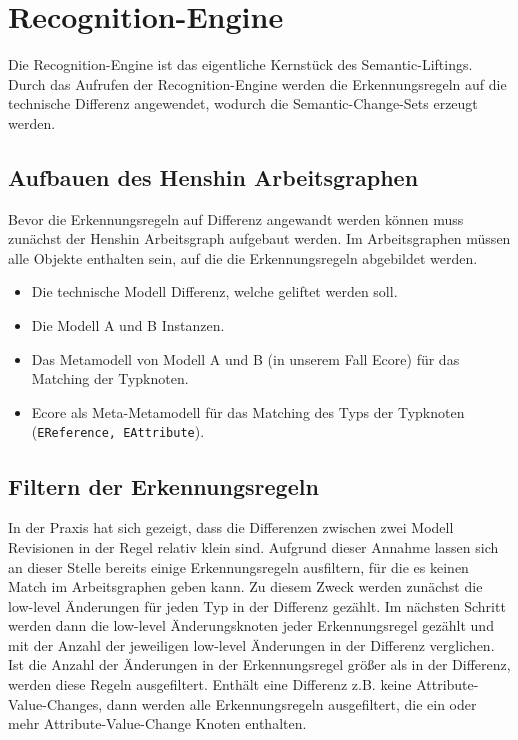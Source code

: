 \chapter{Recognition-Engine}
\label{recognition}

Die Recognition-Engine ist das eigentliche Kernstück des Semantic-Liftings. Durch das Aufrufen der
Recognition-Engine werden die Erkennungsregeln auf die technische Differenz angewendet, wodurch die
Semantic-Change-Sets erzeugt werden.

\section{Aufbauen des Henshin Arbeitsgraphen}

Bevor die Erkennungsregeln auf Differenz angewandt werden können muss zunächst der Henshin
Arbeitsgraph aufgebaut werden. Im Arbeitsgraphen müssen alle Objekte enthalten sein, auf die die
Erkennungsregeln abgebildet werden.

\begin{itemize}
  \item Die technische Modell Differenz, welche geliftet werden soll.
  \item Die Modell A und B Instanzen.
  \item Das Metamodell von Modell A und B (in unserem Fall Ecore) für das Matching der Typknoten.
  \item Ecore als Meta-Metamodell für das Matching des Typs der Typknoten (\texttt{EReference,
  EAttribute}).
\end{itemize}

\section{Filtern der Erkennungsregeln}
\label{filter}

In der Praxis hat sich gezeigt, dass die Differenzen zwischen zwei Modell Revisionen in der Regel
relativ klein sind. Aufgrund dieser Annahme lassen sich an dieser Stelle bereits einige
Erkennungsregeln ausfiltern, für die es keinen Match im Arbeitsgraphen geben kann. Zu diesem Zweck
werden zunächst die low-level Änderungen für jeden Typ in der Differenz gezählt. Im nächsten Schritt
werden dann die low-level Änderungsknoten jeder Erkennungsregel gezählt und mit der Anzahl der
jeweiligen low-level Änderungen in der Differenz verglichen. Ist die Anzahl der Änderungen in der
Erkennungsregel größer als in der Differenz, werden diese Regeln ausgefiltert. Enthält eine
Differenz z.B. keine Attribute-Value-Changes, dann werden alle Erkennungsregeln ausgefiltert, die
ein oder mehr Attribute-Value-Change Knoten enthalten.


